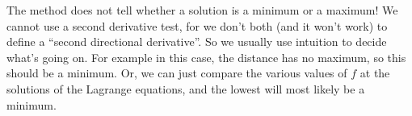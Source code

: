 \bdb
The method does not tell whether a solution is a minimum or a maximum! We cannot use a second derivative test, for we don't both (and it won't work) to define a ``second directional derivative''. So we usually use intuition to decide what's going on. For example in this case, the distance has no maximum, so this should be a minimum. Or, we can just compare the various values of $f$ at the solutions of the Lagrange equations, and the lowest will most likely be a minimum. 
\edb

